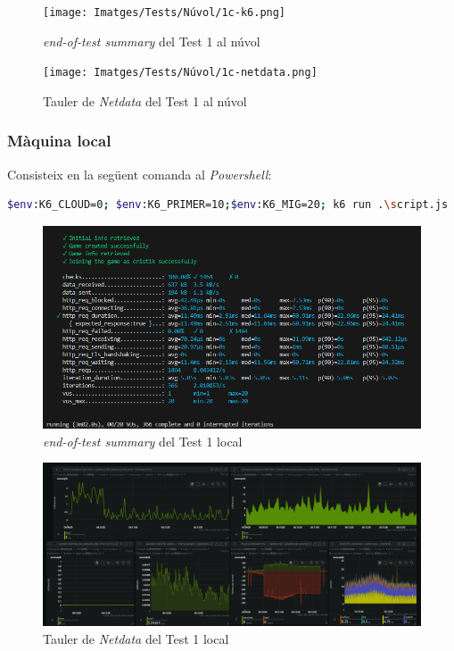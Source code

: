 \begin{figure}[!htbp]
    \texttt{[image: Imatges/Tests/Núvol/1c-k6.png]}  
    \caption{\textit{end-of-test summary} del Test 1 al núvol}
\end{figure}

\begin{figure}[!htbp]
    \texttt{[image: Imatges/Tests/Núvol/1c-netdata.png]}  
    \caption{Tauler de \textit{Netdata} del Test 1 al núvol}
\end{figure}

\subsubsection{Màquina local}
Consisteix en la següent comanda al \textit{Powershell}:
\begin{lstlisting}[language=bash, caption=Test 1 local]
    $env:K6_CLOUD=0; $env:K6_PRIMER=10;$env:K6_MIG=20; k6 run .\script.js
\end{lstlisting}

\begin{figure}[!htbp]
    \includegraphics[width=1\textwidth]{Imatges/Tests/Local/1l-k6.png}  
    \caption{\textit{end-of-test summary} del Test 1 local}
\end{figure}

\begin{figure}[!htbp]
    \includegraphics[width=1\textwidth]{Imatges/Tests/Local/1l-netdata.png}  
    \caption{Tauler de \textit{Netdata} del Test 1 local}
\end{figure}

